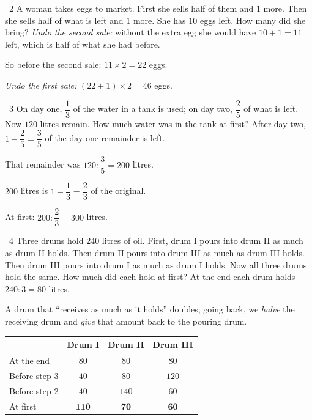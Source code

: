 \gap
\begin{exbox}{\ExWord\ 2}
A woman takes eggs to market. First she sells half of them and $1$ more. Then she sells half of what is left and $1$ more. She has $10$ eggs left. How many did she bring?
\guide
\emph{Undo the second sale:} without the extra egg she would have $10+1=11$ left, which is half of what she had before.\par So before the second sale: $11\times2=22$ eggs.\par
\emph{Undo the first sale:} $(22+1)\times2=46$ eggs.
\end{exbox}
\gap
\begin{exbox}{\ExWord\ 3}
On day one, $\dfrac13$ of the water in a tank is used; on day two, $\dfrac25$ of what is left. Now $120$ litres remain. How much water was in the tank at first?
\guide
After day two, $1-\dfrac25=\dfrac35$ of the day-one remainder is left.\par That remainder was $120:\dfrac35=200$ litres.\par
$200$ litres is $1-\dfrac13=\dfrac23$ of the original.\par At first: $200:\dfrac23=300$ litres.
\end{exbox}
\gap
\begin{exbox}{\ExWord\ 4}
Three drums hold $240$ litres of oil. First, drum I pours into drum II as much as drum II holds. Then drum II pours into drum III as much as drum III holds. Then drum III pours into drum I as much as drum I holds. Now all three drums hold the same. How much did each hold at first?
\guide
At the end each drum holds $240:3=80$ litres.\par A drum that ``receives as much as it holds'' doubles; going back, we \emph{halve} the receiving drum and \emph{give} that amount back to the pouring drum.
\begin{center}
\renewcommand{\arraystretch}{1.25}
\begin{tabular}{|l|c|c|c|}
\hline
 & Drum I & Drum II & Drum III\\\hline
At the end & $80$ & $80$ & $80$\\\hline
Before step 3 & $40$ & $80$ & $120$\\\hline
Before step 2 & $40$ & $140$ & $60$\\\hline
At first & $\mathbf{110}$ & $\mathbf{70}$ & $\mathbf{60}$\\\hline
\end{tabular}
\end{center}
\end{exbox}
